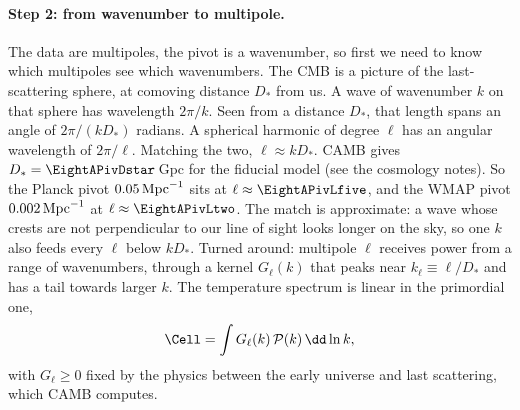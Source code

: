 \paragraph{Step 2: from wavenumber to multipole.}
The data are multipoles, the pivot is a wavenumber, so first we need to know which multipoles
see which wavenumbers.
The CMB is a picture of the last-scattering sphere, at comoving distance $D_*$ from us. A wave of
wavenumber $k$ on that sphere has wavelength $2\pi/k$. Seen from a distance $D_*$, that length
spans an angle of $2\pi/(kD_*)$ radians. A spherical harmonic of degree $\ell$ has an angular
wavelength of $2\pi/\ell$. Matching the two, $\ell\approx kD_*$. CAMB gives
$D_*=\EightAPivDstar$\,Gpc for the fiducial model (see the cosmology notes). So the Planck pivot
$0.05\,{\rm Mpc}^{-1}$ sits at $\ell\approx\EightAPivLfive$, and the WMAP pivot
$0.002\,{\rm Mpc}^{-1}$ at $\ell\approx\EightAPivLtwo$. The match is approximate: a wave whose crests
are not perpendicular to our line of sight looks longer on the sky, so one $k$ also feeds every
$\ell$ below $kD_*$. Turned around: multipole $\ell$ receives power from a range of wavenumbers,
through a kernel $G_\ell(k)$ that peaks near $k_\ell\equiv\ell/D_*$ and has a tail towards larger $k$.
The temperature spectrum is linear in the primordial one,
\begin{equation}
  \Cell=\int G_\ell(k)\,\mathcal P(k)\,\dd\ln k ,
  \label{8a:eq:pivot-kernel}
\end{equation}
with $G_\ell\ge0$ fixed by the physics between the early universe and last scattering, which CAMB
computes.


